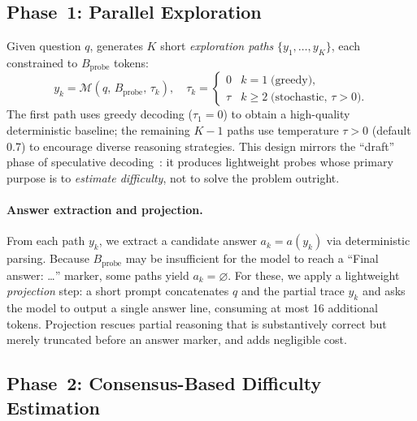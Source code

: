 \subsection{Phase~1: Parallel Exploration}
\label{sec:method:explore}

Given question $q$, \method{} generates $K$ short \emph{exploration paths}
$\{y_1, \ldots, y_K\}$, each constrained to $B_{\mathrm{probe}}$ tokens:
\begin{equation}
  \label{eq:explore}
  y_k = \mathcal{M}(q,\, B_{\mathrm{probe}},\, \tau_k),
  \quad
  \tau_k =
  \begin{cases}
    0   & k = 1 \;\text{(greedy)}, \\
    \tau & k \geq 2 \;\text{(stochastic, } \tau > 0\text{)}.
  \end{cases}
\end{equation}
The first path uses greedy decoding ($\tau_1 = 0$) to obtain a high-quality
deterministic baseline; the remaining $K{-}1$ paths use temperature
$\tau > 0$ (default 0.7) to encourage diverse reasoning strategies.
This design mirrors the ``draft'' phase of speculative
decoding~\citep{leviathan2023fast,chen2023accelerating}: it produces
lightweight probes whose primary purpose is to \emph{estimate difficulty},
not to solve the problem outright.

\paragraph{Answer extraction and projection.}
From each path $y_k$, we extract a candidate answer $a_k = a(y_k)$ via
deterministic parsing.
Because $B_{\mathrm{probe}}$ may be insufficient for the model to reach a
``Final answer: \ldots'' marker, some paths yield $a_k = \varnothing$.
For these, we apply a lightweight \emph{projection} step: a short prompt
concatenates $q$ and the partial trace $y_k$ and asks the model to output a
single answer line, consuming at most 16 additional tokens.
Projection rescues partial reasoning that is substantively correct but
merely truncated before an answer marker, and adds negligible cost.

\subsection{Phase~2: Consensus-Based Difficulty Estimation}
\label{sec:method:decide}

